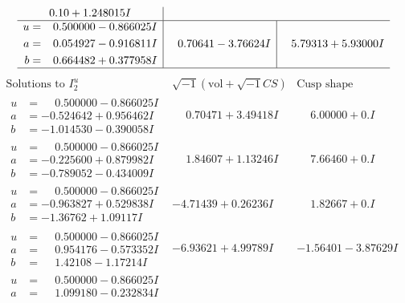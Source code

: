 \documentclass[1p]{elsarticle_modified}
\theoremstyle{definition}
\newcommand{\I}{\sqrt{-1}}
\begin{document}
$$\begin{array}{c|c|c}
0. 10   + 1.248015 I \\ \hline\begin{aligned}
u &= \phantom{-}0.500000 - 0.866025 I \\
a &= \phantom{-}0.054927 - 0.916811 I \\
b &= \phantom{-}0.664482 + 0.377958 I\end{aligned}
 & \phantom{-}0.70641 - 3.76624 I & \phantom{-}5.79313 + 5.93000 I\\
 \hline 
 \end{array}$$\newpage$$\begin{array}{c|c|c}  
\text{Solutions to }I^u_{2}& \I (\text{vol} + \sqrt{-1}CS) & \text{Cusp shape}\\
 \hline 
\begin{aligned}
u &= \phantom{-}0.500000 - 0.866025 I \\
a &= -0.524642 + 0.956462 I \\
b &= -1.014530 - 0.390058 I\end{aligned}
 & \phantom{-}0.70471 + 3.49418 I & \phantom{-}6.00000 + 0. I\phantom{ +0.000000I} \\ \hline\begin{aligned}
u &= \phantom{-}0.500000 - 0.866025 I \\
a &= -0.225600 + 0.879982 I \\
b &= -0.789052 - 0.434009 I\end{aligned}
 & \phantom{-}1.84607 + 1.13246 I & \phantom{-}7.66460 + 0. I\phantom{ +0.000000I} \\ \hline\begin{aligned}
u &= \phantom{-}0.500000 - 0.866025 I \\
a &= -0.963827 + 0.529838 I \\
b &= -1.36762 + 1.09117 I\end{aligned}
 & -4.71439 + 0.26236 I & \phantom{-}1.82667 + 0. I\phantom{ +0.000000I} \\ \hline\begin{aligned}
u &= \phantom{-}0.500000 - 0.866025 I \\
a &= \phantom{-}0.954176 - 0.573352 I \\
b &= \phantom{-}1.42108 - 1.17214 I\end{aligned}
 & -6.93621 + 4.99789 I & -1.56401 - 3.87629 I \\ \hline\begin{aligned}
u &= \phantom{-}0.500000 - 0.866025 I \\
a &= \phantom{-}1.099180 - 0.232834 I \\

\end{aligned}
\end{array}$$
\end{document}
